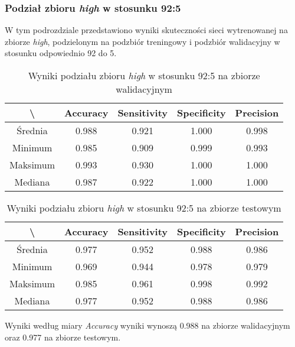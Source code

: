 \subsubsection{Podział zbioru \textit{high} w stosunku 92:5}

W tym podrozdziale przedstawiono wyniki skuteczności sieci wytrenowanej na zbiorze \textit{high}, podzielonym na podzbiór treningowy i podzbiór walidacyjny w stosunku odpowiednio 92 do 5.

\begin{table}[H]
	\centering
	\caption{Wyniki podziału zbioru \textit{high} w stosunku 92:5 na zbiorze walidacyjnym}
	\vspace{6pt}
	{\footnotesize
		\begin{tabular}{|c|c|c|c|c|}
      \hline \textbackslash & Accuracy & Sensitivity & Specificity & Precision \\
      \hline Średnia & 0.988 & 0.921 & 1.000 & 0.998 \\
      \hline Minimum & 0.985 & 0.909 & 0.999 & 0.993 \\
      \hline Maksimum & 0.993 & 0.930 & 1.000 & 1.000 \\
      \hline Mediana & 0.987 & 0.922 & 1.000 & 1.000 \\
      \hline
		\end{tabular}
	}
	\vspace{0pt}
\end{table}

\begin{table}[H]
	\centering
	\caption{Wyniki podziału zbioru \textit{high} w stosunku 92:5 na zbiorze testowym}
	\vspace{6pt}
	{\footnotesize
		\begin{tabular}{|c|c|c|c|c|}
      \hline \textbackslash & Accuracy & Sensitivity & Specificity & Precision \\
      \hline Średnia & 0.977 & 0.952 & 0.988 & 0.986 \\
      \hline Minimum & 0.969 & 0.944 & 0.978 & 0.979 \\
      \hline Maksimum & 0.985 & 0.961 & 0.998 & 0.992 \\
      \hline Mediana & 0.977 & 0.952 & 0.988 & 0.986 \\
      \hline
		\end{tabular}
	}
	\vspace{0pt}
\end{table}

Wyniki według miary \textit{Accuracy} wyniki wynoszą 0.988 na zbiorze walidacyjnym oraz 0.977 na zbiorze testowym.

